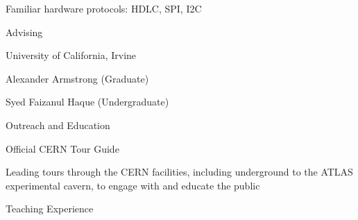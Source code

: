 \begin{minipage}{0.8\textwidth}
\begin{minipage}{0.8\textwidth}
\begin{minipage}{0.8\textwidth}
    \vspace{0.1in}
    \hspace{0.15in}
    \begin{minipage}{\textwidth}
    Familiar hardware protocols: HDLC, SPI, I2C
    \end{minipage}



\end{minipage}

\vspace{0.35in}
{\Large Advising}\\
\HRule

\hspace{0.25in}
\begin{minipage}{0.8\textwidth}
	\vspace{0.15in}
	University of California, Irvine

	\hspace{0.15in}
	\begin{minipage}{1.0\textwidth}
		\vspace{0.1in}
		Alexander Armstrong (Graduate)

		\vspace{0.1in}
		Syed Faizanul Haque (Undergraduate)
	\end{minipage}
\end{minipage}

{\Large Outreach and Education} \\
\HRule

\hspace{0.25in}
\begin{minipage}{0.8\textwidth}
	\vspace{0.15in}
	Official CERN Tour Guide

	\hspace{0.15in}
	\begin{minipage}{1.0\textwidth}
		\vspace{0.15in}

		Leading tours through the CERN facilities, including underground to the ATLAS experimental cavern, to engage with and educate the public
	\end{minipage}
\end{minipage}

\vspace{0.2in}
{\Large Teaching Experience}\\
\HRule


\end{minipage}
\end{minipage}
